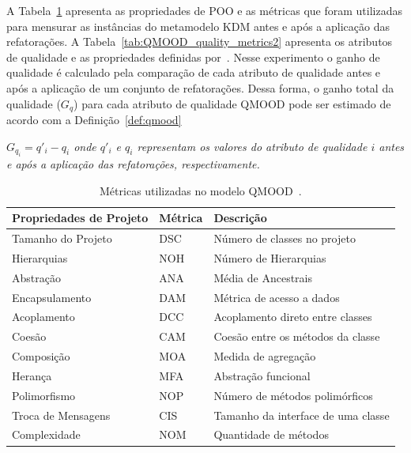 A Tabela~\ref{tab:QMOOD_quality_metrics} apresenta as propriedades de POO e as métricas que foram utilizadas para mensurar as instâncias do metamodelo KDM antes e após a aplicação das refatorações. A Tabela~\ref{tab:QMOOD_quality_metrics2} apresenta os atributos de qualidade e as propriedades definidas por~. Nesse experimento o ganho de qualidade é calculado pela comparação de cada atributo de qualidade antes e após a aplicação de um conjunto de refatorações. Dessa forma, o ganho total da qualidade ($G_{q}$) para cada atributo de qualidade QMOOD pode ser estimado de acordo com a Definição~\ref{def:qmood}

\begin{definicao}\label{def:qmood}
    \textit{$G_{q_{i}} = q'_{i} - q_{i}$ onde $q'_{i}$ e $q_{i}$ representam os valores do atributo de qualidade $i$ antes e após a aplicação das refatorações, respectivamente.}
\end{definicao}

\begin{table}[!h]
\caption{Métricas utilizadas no modelo QMOOD~\cite{Bansiya_QMOOD}.}
\label{tab:QMOOD_quality_metrics}
\begin{center}
\begin{tabular}{ | m{4.2cm} | m{1.4cm}| m{6cm} | } 
\hline
Propriedades de Projeto & Métrica & Descrição \\ 
\hline
Tamanho do Projeto & DSC & Número de classes no projeto \\ 
\hline
Hierarquias & NOH & Número de Hierarquias \\ 
\hline
Abstração & ANA & Média de Ancestrais \\ 
\hline
Encapsulamento & DAM & Métrica de acesso a dados \\ 
\hline
Acoplamento & DCC & Acoplamento direto entre classes \\ 
\hline
Coesão & CAM & Coesão entre os métodos da classe \\ 
\hline
Composição & MOA & Medida de agregação \\ 
\hline
Herança & MFA & Abstração funcional \\ 
\hline
Polimorfismo & NOP & Número de métodos polimórficos \\ 
\hline
Troca de Mensagens & CIS & Tamanho da interface de uma classe \\ 
\hline
Complexidade & NOM & Quantidade de métodos \\ 
\hline
\end{tabular}
\end{center}
\end{table}

